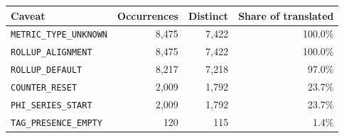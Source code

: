 \begin{tabular}{@{}lrrr@{}}
\toprule
Caveat & Occurrences & Distinct & Share of translated \\
\midrule
\texttt{METRIC\_TYPE\_UNKNOWN} & 8,475 & 7,422 & 100.0\% \\
\texttt{ROLLUP\_ALIGNMENT} & 8,475 & 7,422 & 100.0\% \\
\texttt{ROLLUP\_DEFAULT} & 8,217 & 7,218 & 97.0\% \\
\texttt{COUNTER\_RESET} & 2,009 & 1,792 & 23.7\% \\
\texttt{PHI\_SERIES\_START} & 2,009 & 1,792 & 23.7\% \\
\texttt{TAG\_PRESENCE\_EMPTY} & 120 & 115 & 1.4\% \\
\bottomrule
\end{tabular}
